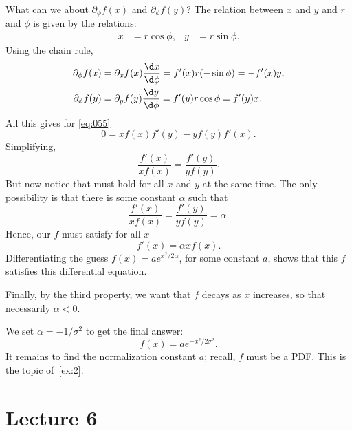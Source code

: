 \begin{exercise}
\begin{solution}
What can we about $\partial_{\phi} f(x)$ and $\partial_{\phi}f(y)$?
The relation between $x$ and $y$ and $r$ and $\phi$ is given by the relations:
\begin{align}
\label{eq:056}
x &= r \cos \phi, & y&=r\sin \phi.
\end{align}
Using the chain rule,
\begin{align}
  \label{eq:057}
  \partial_{\phi} f(x) &= \partial_{x} f(x) \frac{\d x}{\d \phi} = f'(x) r (-\sin \phi) = - f'(x) y, \\
  \partial_{\phi} f(y) &= \partial_{y} f(y) \frac{\d y}{\d \phi} = f'(y) r \cos \phi =  f'(y) x.
\end{align}
All this gives for \cref{eq:055}
\begin{equation}
\label{eq:058}
0 = x f(x) f'(y) - y f(y)f'(x).
\end{equation}
Simplifying,
\begin{equation}
  \label{eq:059}
   \frac{f'(x)}{x f(x)} = \frac{f'(y)}{ y f(y)}.
\end{equation}
But now notice that must hold for all $x$ and $y$ at the same time. The only possibility is that there is some constant $\alpha$ such that
\begin{equation}
\label{eq:0510}
   \frac{f'(x)}{x f(x)} =  \frac{f'(y)}{y f(y)} = \alpha.
\end{equation}
Hence, our $f$ must satisfy for all $x$
\begin{equation}
\label{eq:0511}
f'(x) = \alpha x f(x).
\end{equation}
Differentiating the guess $f(x) = a e^{ x^2/{2 \alpha}}$, for some constant $a$, shows that this $f$ satisfies this differential equation.

Finally, by the third property, we want that $f$ decays as $x$ increases, so that necessarily $\alpha<0$.


We set $\alpha = -1/\sigma^{2}$ to get the final answer:
\begin{equation}
  \label{eq:0512}
  f(x) = a e^{-x^{2}/2 \sigma^{2}}.
\end{equation}
It remains to find the normalization constant $a$; recall, $f$ must be a PDF. This is the topic of~\cref{ex:2}.
\end{solution}
\end{exercise}

\section{Lecture 6}

